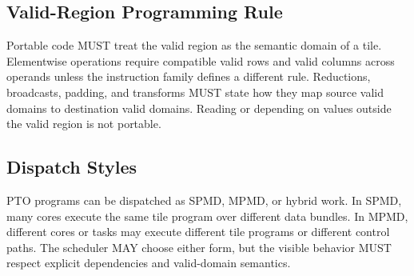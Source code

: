 \subsection{Valid-Region Programming Rule}
Portable code MUST treat the valid region as the semantic domain of a tile. Elementwise operations require compatible valid rows and valid columns across operands unless the instruction family defines a different rule. Reductions, broadcasts, padding, and transforms MUST state how they map source valid domains to destination valid domains. Reading or depending on values outside the valid region is not portable.

\subsection{Dispatch Styles}
PTO programs can be dispatched as SPMD, MPMD, or hybrid work. In SPMD, many cores execute the same tile program over different data bundles. In MPMD, different cores or tasks may execute different tile programs or different control paths. The scheduler MAY choose either form, but the visible behavior MUST respect explicit dependencies and valid-domain semantics.
